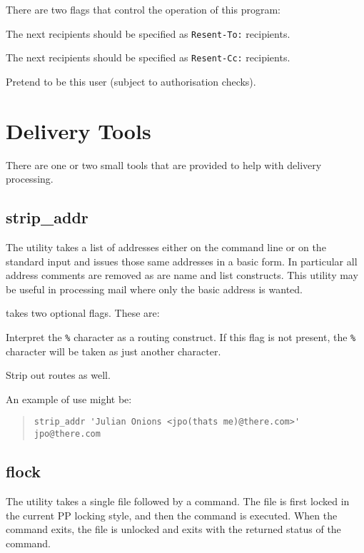 There are two flags that control the operation of this program:
\begin{describe}
\item[\verb|-t|:] The next recipients should be specified as
\verb|Resent-To:| recipients.
\item[\verb|-c|:] The next recipients should be specified as
\verb|Resent-Cc:| recipients.
\item[\verb|-u username|:] Pretend to be this user (subject to
authorisation checks).
\end{describe}

\section{Delivery Tools}
There are one or two small tools that are provided to help with
delivery processing.

\subsection{strip\_addr}

The  utility takes a list of addresses either on the
command line or on the standard input and issues those same addresses
in a basic form. In particular all address comments are removed as are
name and list constructs. This utility may be useful in processing
mail where only the basic address is wanted.

 takes two optional flags. These are:
\begin{describe}
\item[\verb|-p|:] Interpret the \verb|%| character as a routing
construct. If this flag is not present, the \verb|%| character will be
taken as just another character. 
\item[\verb|-r|:] Strip out routes as well.
\end{describe}

An example of use might be:
\begin{quote}\small\begin{verbatim}
strip_addr 'Julian Onions <jpo(thats me)@there.com>'
jpo@there.com
\end{verbatim}\end{quote}

\subsection{flock}
The  utility takes a single file followed by a command. The
file is first locked in the current PP locking style, and then the
command is executed. When the command exits, the file is unlocked and
 exits with the returned status of the command.

